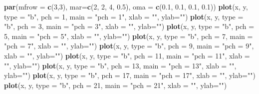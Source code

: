 \documentclass[
]{book}
\newenvironment{Shaded}{\begin{snugshade}}{\end{snugshade}}
\newcommand{\AttributeTok}[1]{\textcolor[rgb]{0.13,0.29,0.53}{#1}}
\newcommand{\DecValTok}[1]{\textcolor[rgb]{0.00,0.00,0.81}{#1}}
\newcommand{\FloatTok}[1]{\textcolor[rgb]{0.00,0.00,0.81}{#1}}
\newcommand{\FunctionTok}[1]{\textcolor[rgb]{0.13,0.29,0.53}{\textbf{#1}}}
\newcommand{\NormalTok}[1]{#1}
\newcommand{\StringTok}[1]{\textcolor[rgb]{0.31,0.60,0.02}{#1}}
\begin{document}
\begin{Shaded}
\begin{Highlighting}[]
\FunctionTok{par}\NormalTok{(}\AttributeTok{mfrow =} \FunctionTok{c}\NormalTok{(}\DecValTok{3}\NormalTok{,}\DecValTok{3}\NormalTok{), }\AttributeTok{mar=}\FunctionTok{c}\NormalTok{(}\DecValTok{2}\NormalTok{, }\DecValTok{2}\NormalTok{, }\DecValTok{4}\NormalTok{, }\FloatTok{0.5}\NormalTok{), }\AttributeTok{oma =} \FunctionTok{c}\NormalTok{(}\FloatTok{0.1}\NormalTok{, }\FloatTok{0.1}\NormalTok{, }\FloatTok{0.1}\NormalTok{, }\FloatTok{0.1}\NormalTok{))}
\FunctionTok{plot}\NormalTok{(x, y, }\AttributeTok{type =} \StringTok{"b"}\NormalTok{, }\AttributeTok{pch =} \DecValTok{1}\NormalTok{, }\AttributeTok{main =} \StringTok{"pch = 1"}\NormalTok{, }\AttributeTok{xlab =} \StringTok{""}\NormalTok{, }\AttributeTok{ylab=}\StringTok{""}\NormalTok{)}
\FunctionTok{plot}\NormalTok{(x, y, }\AttributeTok{type =} \StringTok{"b"}\NormalTok{, }\AttributeTok{pch =} \DecValTok{3}\NormalTok{, }\AttributeTok{main =} \StringTok{"pch = 3"}\NormalTok{, }\AttributeTok{xlab =} \StringTok{""}\NormalTok{, }\AttributeTok{ylab=}\StringTok{""}\NormalTok{)}
\FunctionTok{plot}\NormalTok{(x, y, }\AttributeTok{type =} \StringTok{"b"}\NormalTok{, }\AttributeTok{pch =} \DecValTok{5}\NormalTok{, }\AttributeTok{main =} \StringTok{"pch = 5"}\NormalTok{, }\AttributeTok{xlab =} \StringTok{""}\NormalTok{, }\AttributeTok{ylab=}\StringTok{""}\NormalTok{)}
\FunctionTok{plot}\NormalTok{(x, y, }\AttributeTok{type =} \StringTok{"b"}\NormalTok{, }\AttributeTok{pch =} \DecValTok{7}\NormalTok{, }\AttributeTok{main =} \StringTok{"pch = 7"}\NormalTok{, }\AttributeTok{xlab =} \StringTok{""}\NormalTok{, }\AttributeTok{ylab=}\StringTok{""}\NormalTok{)}
\FunctionTok{plot}\NormalTok{(x, y, }\AttributeTok{type =} \StringTok{"b"}\NormalTok{, }\AttributeTok{pch =} \DecValTok{9}\NormalTok{, }\AttributeTok{main =} \StringTok{"pch = 9"}\NormalTok{, }\AttributeTok{xlab =} \StringTok{""}\NormalTok{, }\AttributeTok{ylab=}\StringTok{""}\NormalTok{)}
\FunctionTok{plot}\NormalTok{(x, y, }\AttributeTok{type =} \StringTok{"b"}\NormalTok{, }\AttributeTok{pch =} \DecValTok{11}\NormalTok{, }\AttributeTok{main =} \StringTok{"pch = 11"}\NormalTok{, }\AttributeTok{xlab =} \StringTok{""}\NormalTok{, }\AttributeTok{ylab=}\StringTok{""}\NormalTok{)}
\FunctionTok{plot}\NormalTok{(x, y, }\AttributeTok{type =} \StringTok{"b"}\NormalTok{, }\AttributeTok{pch =} \DecValTok{13}\NormalTok{, }\AttributeTok{main =} \StringTok{"pch = 13"}\NormalTok{, }\AttributeTok{xlab =} \StringTok{""}\NormalTok{, }\AttributeTok{ylab=}\StringTok{""}\NormalTok{)}
\FunctionTok{plot}\NormalTok{(x, y, }\AttributeTok{type =} \StringTok{"b"}\NormalTok{, }\AttributeTok{pch =} \DecValTok{17}\NormalTok{, }\AttributeTok{main =} \StringTok{"pch = 17"}\NormalTok{, }\AttributeTok{xlab =} \StringTok{""}\NormalTok{, }\AttributeTok{ylab=}\StringTok{""}\NormalTok{)}
\FunctionTok{plot}\NormalTok{(x, y, }\AttributeTok{type =} \StringTok{"b"}\NormalTok{, }\AttributeTok{pch =} \DecValTok{21}\NormalTok{, }\AttributeTok{main =} \StringTok{"pch = 21"}\NormalTok{, }\AttributeTok{xlab =} \StringTok{""}\NormalTok{, }\AttributeTok{ylab=}\StringTok{""}\NormalTok{)}
\end{Highlighting}
\end{Shaded}
\end{document}
